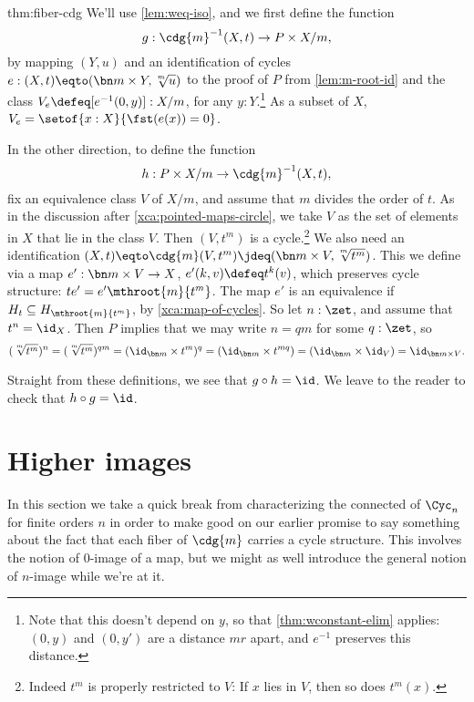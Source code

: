 \begin{implementation}{thm:fiber-cdg}
  We'll use \cref{lem:weq-iso}, and we first define the function
  \[
    g : \cdg{m}^{-1}(X,t) \to P\times X/m,
  \]
  by mapping $(Y,u)$ and an identification of cycles
  $e : (X,t) \eqto (\bn m\times Y,\sqrt[\uproot{2}m]{u})$
  to the proof of $P$ from \cref{lem:m-root-id}
  and the class $V_e\defeq [e^{-1}(0,y)]:X/m$, for any $y:Y$.\footnote{%
  Note that this doesn't depend on $y$, so that \cref{thm:wconstant-elim}
  applies: $(0,y)$ and $(0,y')$ are a distance $mr$ apart,
  and $e^{-1}$ preserves this distance.}
  As a subset of $X$, $V_e=\setof{x:X}{\fst(e(x))=0}$.

  In the other direction, to define the function
  \[
    h : P\times X/m \to \cdg{m}^{-1}(X,t),
  \]
  fix an equivalence class $V$ of $X/m$,
  and assume that $m$ divides the order of $t$.
  As in the discussion after \cref{xca:pointed-maps-circle},
  we take $V$ as the set of elements in $X$ that lie in the class $V$.
  Then $(V,t^m)$ is a cycle.\footnote{%
  Indeed $t^m$ is properly restricted to $V$: If $x$ lies in $V$,
  then so does $t^m(x)$.}
  We also need an identification
  $(X,t)\eqto\cdg{m}(V,t^m)\jdeq(\bn m\times V,\sqrt[\uproot{2}m]{t^m})$.
  This we define via a map $e' : \bn m\times V \to X$, $e'(k,v) \defeq t^k(v)$,
  which preserves cycle structure: $te'= e'\mthroot{m}{t^m}$.
  The map $e'$ is an equivalence if $H_t \subseteq H_{\mthroot{m}{t^m}}$,
  by \cref{xca:map-of-cycles}.
  So let $n:\zet$, and assume that $t^n=\id_X$.
  Then $P$ implies that we may write $n=qm$ for some $q:\zet$,
  so
  \[
    (\sqrt[\uproot{2}m]{t^m})^n
    = (\sqrt[\uproot{2}m]{t^m})^{qm}
    = (\id_{\bn m} \times t^m)^q = (\id_{\bn m} \times t^{mq}) 
    = (\id_{\bn m} \times \id_V)= \id_{\bn m \times V}.
  \]

  Straight from these definitions, we see that $g\circ h=\id$.
  We leave to the reader to check that $h\circ g=\id$.
\end{implementation}

\section{Higher images}
\label{sec:higher-images}

In this section we take a quick break from characterizing the connected \coverings
of $\Cyc_n$ for finite orders $n$ in order to make good on our earlier promise
to say something about the fact that each fiber of $\cdg{m}$ 
carries a cycle structure.
This involves the notion of $0$-image of a map, but we might as well 
introduce the general notion of $n$-image while we're at it.

